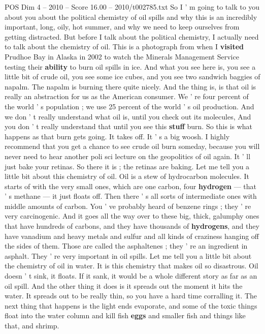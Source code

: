 \begin{textsample}{POS Dim 4 – 2010 – Score 16.00 – 2010/t002785.txt}  \label{ex:f4_pos_063}
So I ' m going to talk to you about you about the political chemistry of oil spills and why this is an incredibly important, long, oily, hot summer, and why we need to keep ourselves from getting distracted.
But before I talk about the political chemistry, I actually need to talk about the chemistry of oil.
This is a photograph from when I \textbf{visited} Prudhoe Bay in Alaska in 2002 to watch the Minerals Management Service testing their \textbf{ability} to burn oil spills in ice.
And what you see here is, you see a little bit of crude oil, you see some ice cubes, and you see two sandwich baggies of napalm.
The napalm is burning there quite nicely.
And the thing is, is that oil is really an abstraction for us as the American consumer.
We ' re four percent of the world ' s population ; we use 25 percent of the world ' s oil production.
And we don ' t really understand what oil is, until you check out its molecules, And you don ' t really understand that until you see this \textbf{stuff} burn.
So this is what happens as that burn gets going.
It takes off.
It ' s a big woosh.
I highly recommend that you get a chance to see crude oil burn someday, because you will never need to hear another poli sci lecture on the geopolitics of oil again.
It ' ll just bake your retinas.
So there it is ; the retinas are baking.
Let me tell you a little bit about this chemistry of oil.
Oil is a stew of hydrocarbon molecules.
It starts of with the very small ones, which are one carbon, four \textbf{hydrogen} — that ' s methane — it just floats off.
Then there ' s all sorts of intermediate ones with middle amounts of carbon.
You ' ve probably heard of benzene rings ; they ' re very carcinogenic.
And it goes all the way over to these big, thick, galumphy ones that have hundreds of carbons, and they have thousands of \textbf{hydrogens}, and they have vanadium and heavy metals and sulfur and all kinds of craziness hanging off the sides of them.
Those are called the asphaltenes ; they ' re an ingredient in asphalt.
They ' re very important in oil spills.
Let me tell you a little bit about the chemistry of oil in water.
It is this chemistry that makes oil so disastrous.
Oil doesn ' t sink, it floats.
If it sank, it would be a whole different story as far as an oil spill.
And the other thing it does is it spreads out the moment it hits the water.
It spreads out to be really thin, so you have a hard time corralling it.
The next thing that happens is the light ends evaporate, and some of the toxic things float into the water column and kill fish \textbf{eggs} and smaller fish and things like that, and shrimp.

\end{textsample}
